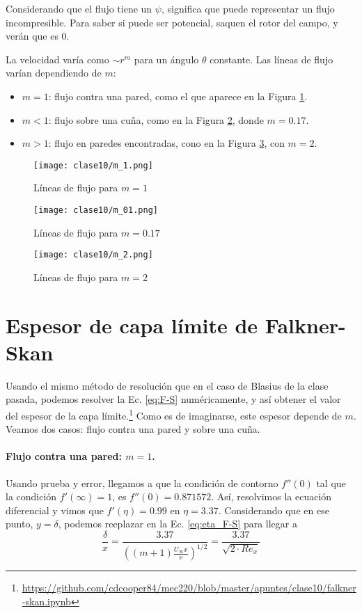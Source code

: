 Considerando que el flujo tiene un $\psi$, significa que puede representar un flujo incompresible.
Para saber si puede ser potencial, saquen el rotor del campo, y verán que es $0$.

La velocidad varía como $\sim r^m$ para un ángulo $\theta$ constante. 
Las líneas de flujo varían dependiendo de $m$:
%
\begin{itemize}
\item $m=1$: flujo contra una pared, como el que aparece en la Figura \ref{fig:m_1}.
\item $m<1$: flujo sobre una cuña, como en la Figura \ref{fig:m_01}, donde $m=0.17$.
\item $m>1$: flujo en paredes encontradas, cono en la Figura \ref{fig:m_2}, con $m=2$.
\end{itemize}

\begin{figure}
\centering
\texttt{[image: clase10/m\_1.png]}
\caption{Líneas de flujo para $m=1$}
\label{fig:m_1}
\end{figure}
%
\begin{figure}
\centering
\texttt{[image: clase10/m\_01.png]}
\caption{Líneas de flujo para $m=0.17$}
\label{fig:m_01}
\end{figure}
%
\begin{figure}
\centering
\texttt{[image: clase10/m\_2.png]}
\caption{Líneas de flujo para $m=2$}
\label{fig:m_2}
\end{figure}

\section*{Espesor de capa límite de Falkner-Skan}
Usando el mismo método de resolución que en el caso de Blasius de la clase pasada, podemos resolver la Ec. \eqref{eq:F-S} numéricamente, y así obtener el valor del espesor de la capa límite.\footnote{\url{https://github.com/cdcooper84/mec220/blob/master/apuntes/clase10/falkner-skan.ipynb}}
Como es de imaginarse, este espesor depende de $m$.
Veamos dos casos: flujo contra una pared y sobre una cuña.

\paragraph*{Flujo contra una pared: $m=1$.}
Usando prueba y error, llegamos a que la condición de contorno $f''(0)$ tal que la condición $f'(\infty)=1$, es $f''(0)=0.871572$.
Así, resolvimos la ecuación diferencial y vimos que $f'(\eta) = 0.99$ en $\eta=3.37$. 
Considerando que en ese punto, $y=\delta$, podemos reeplazar en la Ec. \eqref{eq:eta_F-S} para llegar a
%
\begin{equation}
\frac{\delta}{x}=\frac{3.37}{\left((m+1)\frac{U_\infty x}{\nu}\right)^{1/2}} = \frac{3.37}{\sqrt{2\cdot Re_x}} 
\end{equation}


